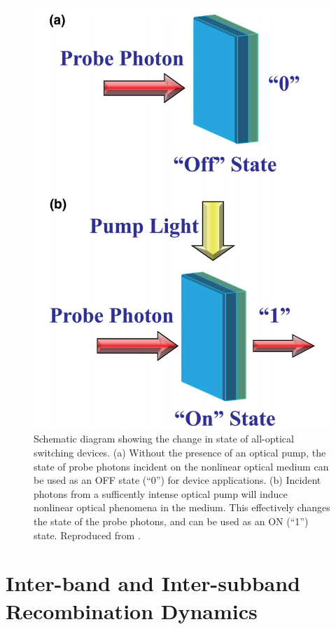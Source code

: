 \begin{figure}[ht]
	\centering
	\includegraphics[scale=0.2]{images/chapter_prior_works/optical_switching_chai_2017}
	\caption{Schematic diagram showing the change in state of all-optical switching devices. (a) Without the presence of an optical pump, the state of probe photons incident on the nonlinear optical medium can be used as an OFF state (``0'') for device applications. (b) Incident photons from a sufficently intense optical pump will induce nonlinear optical phenomena in the medium. This effectively changes the state of the probe photons, and can be used as an ON (``1'') state. Reproduced from \cite{chai2017ultrafast}.}
	\label{fig:optical_switch_chai_2017}
\end{figure}

\section{Inter-band and Inter-subband Recombination Dynamics}

